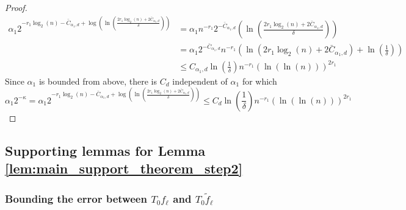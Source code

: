 \documentclass[12pt]{article}
\theoremstyle{remark}
\newcommand{\wtilde}[1]{\widetilde{#1}}
\begin{document}
\begin{appendices}
\begin{proof}
       \begin{equation}
    \begin{array}{ll}
     \alpha_1 2^{-r_1\log_2(n) - \bar{C}_{\alpha_1,d} + \log\left(\ln\left(\frac{2r_1\log_2(n) + 2 \bar{C}_{\alpha_1,d}}{\delta}\right)\right)} &=   \alpha_1 n^{-r_1}2^{-\bar{C}_{ \alpha_1,d}}\left(\ln\left(\frac{2r_1\log_2(n) + 2\bar{C}_{ \alpha_1,d}}{\delta}\right)\right)
     \\
         & =  \alpha_1 2^{-\bar{C}_{\alpha_1,d}} n^{-r_1}\left(\ln\left(2r_1\log_2(n) + 2\bar{C}_{ \alpha_1,d}\right)+\ln\left(\frac{1}{\delta}\right)\right)\\
         & \leq C_{ \alpha_1,d} \ln\left(\frac{1}{\delta}\right) n^{-r_1}\left(\ln\left(\ln(n) \right)\right)^{2r_1}
    \end{array}
    \end{equation}
    Since $\alpha_1$ is bounded from above, there is  $ C_{d}$ independent of $\alpha_1$ for which
    \begin{equation}
      \alpha_1 2^{-\kappa} = \alpha_1 2^{-r_1\log_2(n) - \bar{C}_{ \alpha_1,d} + \log\left(\ln\left(\frac{2r_1\log_2(n) + 2 \bar{C}_{ \alpha_1,d}}{\delta}\right)\right)} \leq C_{ d} \ln\left(\frac{1}{\delta}\right) n^{-r_1}\left(\ln\left(\ln(n) \right)\right)^{2r_1}
    \end{equation}
\end{proof}



\subsection{Supporting lemmas for Lemma \ref{lem:main_support_theorem_step2}}
\label{sec:ProofofLemAlphaHalf}

\subsubsection{Bounding the error between $T_0 {f_\ell}$ and $T_0\wtilde{f}_\ell$}\label{sec:Tf_Tf_tilde_err}
\usetikzlibrary{calc}

\begin{figure}[omitted: a diagram of this paper's results, not reproduced here]\label{tikz:lemTf-Tftilde_lemmas}\end{figure}







\end{appendices}
\end{document}
